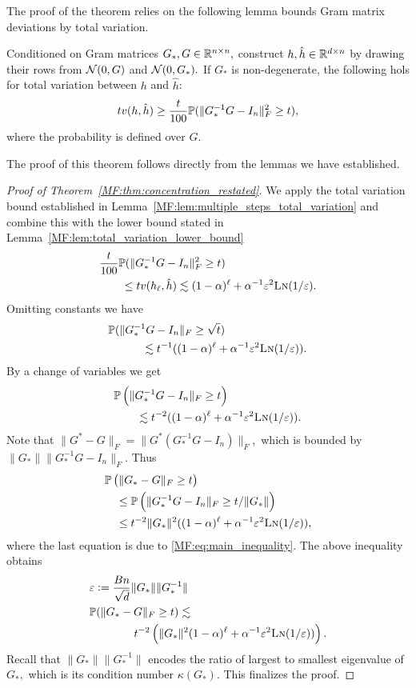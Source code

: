 The proof of the theorem relies on the following lemma bounds Gram matrix deviations by total variation.

\begin{lemma}\label{MF:lem:total_variation_lower_bound}
Conditioned on Gram matrices $G_*,G\in\mathbb{R}^{n\times n},$ construct $h, \hat h\in\mathbb{R}^{d\times n}$ by drawing their rows \iid from $\mathcal{N}(0,G)$ and $\mathcal{N}(0,G_*).$ If $G_*$ is non-degenerate, the following hols for total variation between $h$ and $\hat h$:
\begin{align}
    {{tv}}(h,\hat h)\ge \frac{t}{100}\mathbb{P}(\|G_*^{-1} G - I_n\|_F^2 \ge t),
\end{align}
where the probability is defined over $G.$
\end{lemma}

The proof of this theorem follows directly from the lemmas we have established. 

\begin{proof}[Proof of Theorem~\ref{MF:thm:concentration_restated}]
We apply the total variation bound established in Lemma~\ref{MF:lem:multiple_steps_total_variation} and combine this with the lower bound stated in Lemma~\ref{MF:lem:total_variation_lower_bound} 
\begin{align}
    &\frac{t}{100}\mathbb{P}(\|G_*^{-1} G - I_n\|_F^2 \ge t)\\
    &\qquad \le {{tv}}(h_\ell,\hat h)\lesssim (1-\alpha)^\ell + \alpha^{-1} {\varepsilon}^2 \text{\sc{Ln}}(1/{\varepsilon}) .\label{MF:eq:main_inequality}
\end{align}
Omitting constants we have
\begin{align}
    &\mathbb{P}(\|G_*^{-1} G - I_n\|_F \ge \sqrt{t})\\
    &\quad \qquad \lesssim t^{-1}((1-\alpha)^\ell + \alpha^{-1} {\varepsilon}^2 \text{\sc{Ln}}(1/{\varepsilon})).
\end{align}
By a change of variables we get
\begin{align}
    &\mathbb{P}\left(\|G_*^{-1} G - I_n\|_F \ge t\right)\\
    &\qquad \lesssim t^{-2}((1-\alpha)^\ell + \alpha^{-1} {\varepsilon}^2 \text{\sc{Ln}}(1/{\varepsilon})).
\end{align}
Note that $\|G^* - G \|_F = \|G^*(G^{-1}_* G - I_n)\|_F,$ which is bounded by $\|G_*\|\|G^{-1}_* G- I_n\|_F.$ Thus
\begin{align}
    &\mathbb{P}\left(\|G_* - G \|_F \ge t\right) \\
    &\quad \le \mathbb{P}\left(\|G_*^{-1} G - I_n\|_F \ge t/\|G_*\|\right) \\
    &\quad \le t^{-2} \|G_*\|^2 ((1-\alpha)^\ell+ \alpha^{-1}{\varepsilon}^2\text{\sc{Ln}}(1/{\varepsilon})),
\end{align}
where the last equation is due to \eqref{MF:eq:main_inequality}. The above inequality obtains
\begin{align}
& {\varepsilon}:=\frac{ B n }{\sqrt{d}}\|G_*\|\|G_*^{-1}\|\\
  &  \mathbb{P}(\|G_* - G\|_F \ge t)\lesssim \\
  &\qquad \qquad t^{-2}\left( \|G_*\|^2 (1-\alpha)^\ell + \alpha^{-1}{\varepsilon}^2\text{\sc{Ln}}(1/{\varepsilon}))\right).
\end{align}
Recall that $\|G_*\|\|G_*^{-1}\|$ encodes the ratio of largest to smallest eigenvalue of $G_*,$ which is its condition number $\kappa(G_*).$ This finalizes the proof. 
\end{proof}


